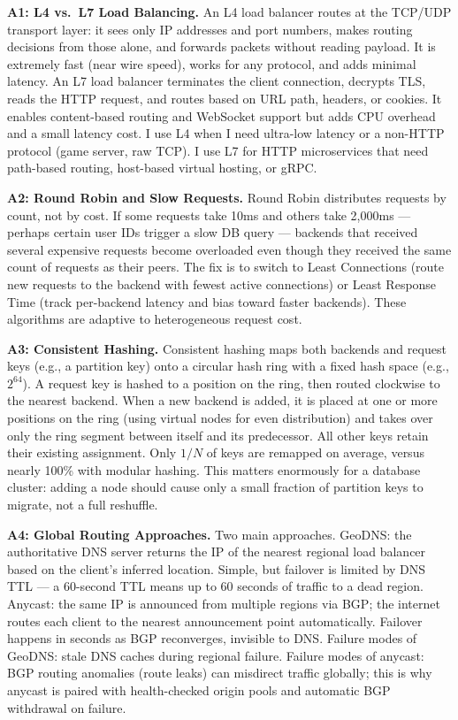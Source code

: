 \documentclass[11pt,a4paper]{article}
\begin{document}
\begin{answerbox}

  \textbf{A1: L4 vs.\ L7 Load Balancing.}
  An L4 load balancer routes at the TCP/UDP transport layer: it sees only IP addresses and port
  numbers, makes routing decisions from those alone, and forwards packets without reading payload.
  It is extremely fast (near wire speed), works for any protocol, and adds minimal latency. An L7
  load balancer terminates the client connection, decrypts TLS, reads the HTTP request, and routes
  based on URL path, headers, or cookies. It enables content-based routing and WebSocket support
  but adds CPU overhead and a small latency cost. I use L4 when I need ultra-low latency or a
  non-HTTP protocol (game server, raw TCP). I use L7 for HTTP microservices that need path-based
  routing, host-based virtual hosting, or gRPC.

  \medskip
  \textbf{A2: Round Robin and Slow Requests.}
  Round Robin distributes requests by count, not by cost. If some requests take 10ms and others
  take 2,000ms --- perhaps certain user IDs trigger a slow DB query --- backends that received
  several expensive requests become overloaded even though they received the same count of
  requests as their peers. The fix is to switch to Least Connections (route new requests to the
  backend with fewest active connections) or Least Response Time (track per-backend latency and
  bias toward faster backends). These algorithms are adaptive to heterogeneous request cost.

  \medskip
  \textbf{A3: Consistent Hashing.}
  Consistent hashing maps both backends and request keys (e.g., a partition key) onto a circular
  hash ring with a fixed hash space (e.g., $2^{64}$). A request key is hashed to a position on the
  ring, then routed clockwise to the nearest backend. When a new backend is added, it is placed at
  one or more positions on the ring (using virtual nodes for even distribution) and takes over only
  the ring segment between itself and its predecessor. All other keys retain their existing
  assignment. Only $1/N$ of keys are remapped on average, versus nearly 100\% with modular hashing.
  This matters enormously for a database cluster: adding a node should cause only a small fraction
  of partition keys to migrate, not a full reshuffle.

  \medskip
  \textbf{A4: Global Routing Approaches.}
  Two main approaches. GeoDNS: the authoritative DNS server returns the IP of the nearest regional
  load balancer based on the client's inferred location. Simple, but failover is limited by DNS
  TTL --- a 60-second TTL means up to 60 seconds of traffic to a dead region. Anycast: the same IP
  is announced from multiple regions via BGP; the internet routes each client to the nearest
  announcement point automatically. Failover happens in seconds as BGP reconverges, invisible to
  DNS. Failure modes of GeoDNS: stale DNS caches during regional failure. Failure modes of
  anycast: BGP routing anomalies (route leaks) can misdirect traffic globally; this is why
  anycast is paired with health-checked origin pools and automatic BGP withdrawal on failure.


\end{answerbox}
\end{document}
